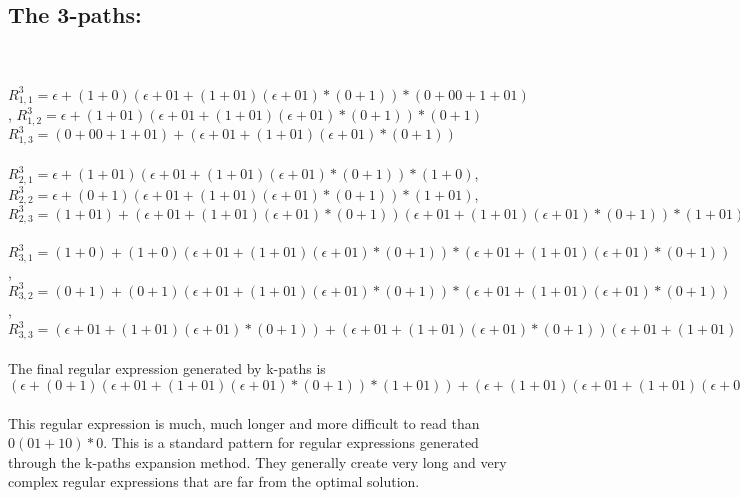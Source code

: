 \documentclass{article}%
\begin{document}
\subsection{The 3-paths:}\\
\\
$R_{1,1}^3 = \epsilon + (1 + 0)(\epsilon + 01 + (1 + 01)(\epsilon + 01)*(0 + 1))*(0 + 00 + 1 + 01)$,
$R_{1,2}^3 = \epsilon + (1 + 01)(\epsilon + 01 + (1 + 01)(\epsilon + 01)*(0 + 1))*(0 + 1)$
$R_{1,3}^3 = (0 + 00 + 1 + 01) + (\epsilon + 01 + (1 + 01)(\epsilon + 01)*(0 + 1))$\\
\\
$R_{2,1}^3 = \epsilon + (1 + 01)(\epsilon + 01 + (1 + 01)(\epsilon + 01)*(0 + 1))*(1 + 0)$,
$R_{2,2}^3 = \epsilon + (0 + 1)(\epsilon + 01 + (1 + 01)(\epsilon + 01)*(0 + 1))*(1 + 01)$,
$R_{2,3}^3 = (1 + 01) + (\epsilon + 01 + (1 + 01)(\epsilon + 01)*(0 + 1))(\epsilon + 01 + (1 + 01)(\epsilon + 01)*(0 + 1))*(1 + 01)$\\
\\
$R_{3,1}^3 = (1 + 0) + (1 + 0)(\epsilon + 01 + (1 + 01)(\epsilon + 01)*(0 + 1))*(\epsilon + 01 + (1 + 01)(\epsilon + 01)*(0 + 1))$,
$R_{3,2}^3 = (0 + 1) + (0 + 1)(\epsilon + 01 + (1 + 01)(\epsilon + 01)*(0 + 1))*(\epsilon + 01 + (1 + 01)(\epsilon + 01)*(0 + 1))$,
$R_{3,3}^3 = (\epsilon + 01 + (1 + 01)(\epsilon + 01)*(0 + 1)) + (\epsilon + 01 + (1 + 01)(\epsilon + 01)*(0 + 1))(\epsilon + 01 + (1 + 01)
(\epsilon + 01)*(0 + 1))*(\epsilon + 01 + (1 + 01)(\epsilon + 01)*(0 + 1))$\\
\\
The final regular expression generated by k-paths is $(\epsilon + (0 + 1)(\epsilon + 01 + (1 + 01)(\epsilon + 01)*(0 + 1))*(1 + 01)) + (\epsilon + (1 + 01)(\epsilon + 01 + (1 + 01)(\epsilon + 01)*(0 + 1))*(0 + 1))$\\
\\
This regular expression is much, much longer and more difficult to read than $0(01 + 10)*0$. This is a standard pattern for regular
expressions generated through the k-paths expansion method. They generally create very long and very complex regular expressions
that are far from the optimal solution.
\end{document}
